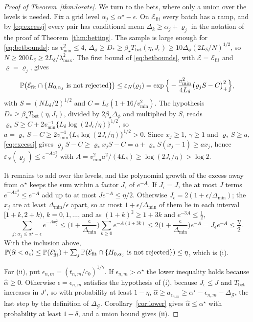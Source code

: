 \begin{proof}[Proof of Theorem~\ref{thm:lorate}]
We turn to the bets, where only a union over the levels is needed. Fix a grid level $\alpha_j\le\alpha^\star-\epsilon$. On $\mathcal E_{\mathrm{fit}}$ every batch has a
ramp, and by \eqref{eq:excessj} every pair has conditional mean $\Delta_k\ge\alpha_j+\varrho_j$ in the notation of the
proof of Theorem~\ref{thm:betting}. The sample is large enough for \eqref{eq:betbounds}: as $v^2_{\min}\le4$,
$\Delta_\phi\ge D_*\ge\beta_\star T_{\mathrm{bet}}(\eta,J_\epsilon)\ge10\Delta_\phi(2L_\delta/N)^{1/2}$, so $N\ge200L_\delta\ge
2L_\delta/\lambda_{\max}^2$. The first bound of \eqref{eq:betbounds}, with $\mathcal E=\mathcal E_{\mathrm{fit}}$ and
$\varrho=\varrho_j$, gives
\[
\mathbb{P}\big(\mathcal E_{\mathrm{fit}}\cap\{H_{0,\alpha_j}\text{ is not rejected}\}\big)\le\varepsilon_N(\varrho_j)
=\exp\Big\{-\frac{v^2_{\min}}{4L_\delta}\big(\varrho_jS-C\big)_+^2\Big\},
\]
with $S=(NL_\delta/2)^{1/2}$ and $C=L_\delta(1+16/v^2_{\min})$. The hypothesis $D_*\ge\beta_\star T_{\mathrm{bet}}(\eta,J_\epsilon)$, divided by $2\beta_\star\Delta_\phi$ and multiplied
by $S$, reads $\varrho_*S\ge C+2v_{\min}^{-1}\{L_\delta\log(2J_\epsilon/\eta)\}^{1/2}$, so
$a=\varrho_*S-C\ge2v_{\min}^{-1}\{L_\delta\log(2J_\epsilon/\eta)\}^{1/2}>0$. Since $x_j\ge1$, $\gamma\ge1$ and
$\varrho_*S\ge a$, \eqref{eq:excessj} gives $\varrho_jS-C\ge\varrho_*x_jS-C=a+\varrho_*S(x_j-1)\ge ax_j$, hence
$\varepsilon_N(\varrho_j)\le e^{-Ax_j^2}$ with $A=v^2_{\min}a^2/(4L_\delta)\ge\log(2J_\epsilon/\eta)>\log2$.

It remains to add over the levels, and the polynomial growth of the excess away from $\alpha^\star$ keeps the sum
within a factor $J_\epsilon$ of $e^{-A}$. If $J_\epsilon=J$, the at most $J$ terms $e^{-Ax_j^2}\le e^{-A}$ add up to at most
$Je^{-A}\le\eta/2$. Otherwise $J_\epsilon=2(1+\epsilon/\Delta_{\min})$; the $x_j$ are at least $\Delta_{\min}/\epsilon$ apart, so at most
$1+\epsilon/\Delta_{\min}$ of them lie in each interval $[1+k,2+k)$, $k=0,1,\dots$, and as $(1+k)^2\ge1+3k$ and
$e^{-3A}\le\tfrac12$,
\[
\sum_{j:\,\alpha_j\le\alpha^\star-\epsilon}e^{-Ax_j^2}\le\Big(1+\frac\epsilon{\Delta_{\min}}\Big)\sum_{k\ge0}e^{-A(1+3k)}
\le2\Big(1+\frac\epsilon{\Delta_{\min}}\Big)e^{-A}=J_\epsilon e^{-A}\le\frac\eta2 .
\]
With the inclusion above, $\mathbb{P}(\widehat\alpha<a_\epsilon)\le\mathbb{P}(\mathcal E_{\mathrm{fit}}^c)
+\sum_j\mathbb{P}(\mathcal E_{\mathrm{fit}}\cap\{H_{0,\alpha_j}\text{ is not rejected}\})\le\eta$, which is (i).

For (ii), put $\epsilon_{n,m}=(t_{n,m}/c_0)^{1/\gamma}$. If $\epsilon_{n,m}>\alpha^\star$ the lower inequality holds
because $\widehat\alpha\ge0$. Otherwise $\epsilon=\epsilon_{n,m}$ satisfies the hypothesis of (i), because
$J_\epsilon\le J$ and $T_{\mathrm{bet}}$ increases in $J'$, so with probability at least $1-\eta$,
$\widehat\alpha\ge a_{\epsilon_{n,m}}\ge\alpha^\star-\epsilon_{n,m}-\Delta_{\mathcal G}$, the last step by the definition of
$\Delta_{\mathcal G}$. Corollary~\ref{cor:lower} gives $\widehat\alpha\le\alpha^\star$ with probability at least $1-\delta$,
and a union bound gives (ii).


\end{proof}
